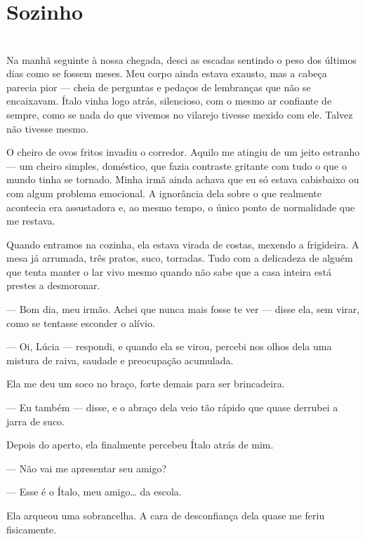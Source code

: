\newpage

\ifdefined\useChapters
\chapter{Sozinho}
\else
\chapter{}
\fi

Na manhã seguinte à nossa chegada, desci as escadas sentindo o peso dos últimos dias como se fossem meses. Meu corpo ainda estava exausto, mas a cabeça parecia pior — cheia de perguntas e pedaços de lembranças que não se encaixavam. Ítalo vinha logo atrás, silencioso, com o mesmo ar confiante de sempre, como se nada do que vivemos no vilarejo tivesse mexido com ele. Talvez não tivesse mesmo.

O cheiro de ovos fritos invadiu o corredor. Aquilo me atingiu de um jeito estranho — um cheiro simples, doméstico, que fazia contraste gritante com tudo o que o mundo tinha se tornado. Minha irmã ainda achava que eu só estava cabisbaixo ou com algum problema emocional. A ignorância dela sobre o que realmente acontecia era assustadora e, ao mesmo tempo, o único ponto de normalidade que me restava.

Quando entramos na cozinha, ela estava virada de costas, mexendo a frigideira. A mesa já arrumada, três pratos, suco, torradas. Tudo com a delicadeza de alguém que tenta manter o lar vivo mesmo quando não sabe que a casa inteira está prestes a desmoronar.

— Bom dia, meu irmão. Achei que nunca mais fosse te ver — disse ela, sem virar, como se tentasse esconder o alívio.

— Oi, Lúcia — respondi, e quando ela se virou, percebi nos olhos dela uma mistura de raiva, saudade e preocupação acumulada.

Ela me deu um soco no braço, forte demais para ser brincadeira.

— Eu também — disse, e o abraço dela veio tão rápido que quase derrubei a jarra de suco.

Depois do aperto, ela finalmente percebeu Ítalo atrás de mim.

— Não vai me apresentar seu amigo?

— Esse é o Ítalo, meu amigo… da escola.

Ela arqueou uma sobrancelha. A cara de desconfiança dela quase me feriu fisicamente.

